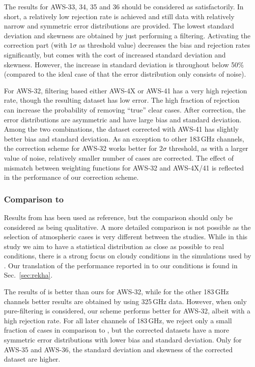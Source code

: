 \documentclass[12pt]{article}
\begin{document}
The results for AWS-33, 34, 35 and 36 should be considered as satisfactorily.
In short, a relatively low rejection rate is achieved and still data with
relatively narrow and symmetric error distributions are provided. The lowest
standard deviation and skewness are obtained by just performing a filtering.
Activating the correction part (with $1\sigma$ as threshold value) decreases
the bias and rejection rates significantly, but comes with the cost of
increased standard deviation and skewness. However, the increase in standard
deviation is throughout below 50\% (compared to the ideal case of that the
error distribution only consists of noise). 

For AWS-32, filtering based either AWS-4X or AWS-41 has a very high rejection
rate, though the resulting dataset has low error. The high fraction of
rejection can increase the probability of removing ``true'' clear cases. After
correction, the error distributions are asymmetric and have large bias and
standard deviation. Among the two combinations, the dataset corrected with
AWS-41 has slightly better bias and standard deviation. As an exception to
other 183\,GHz channels, the correction scheme for AWS-32 works better for
$2\sigma$ threshold, as with a larger value of noise, relatively smaller number
of cases are corrected. The effect of mismatch between weighting functions for
AWS-32 and AWS-4X/41 is reflected in the performance of our correction scheme.

\subsubsection{Comparison to \citet{rekha2012potential}}
%
Results from \citet{rekha2012potential} has been used as reference, but the
comparison should only be considered as being qualitative. A more detailed
comparison is not possible as the selection of atmospheric cases is very
different between the studies. While in this study we aim to have a statistical
distribution as close as possible to real conditions, there is a strong focus on
cloudy conditions in the simulations used by \citet{rekha2012potential}. Our
translation of the performance reported in \citet{rekha2012potential} to our
conditions is found in Sec.~\ref{sec:rekha}.

The results of \citet{rekha2012potential} is better than ours for AWS-32, while
for the other 183\,GHz channels better results are obtained by using 325\,GHz
data. However, when only pure-filtering is considered, our scheme performs
better for AWS-32, albeit with a high rejection rate. For all later channels of
183\,GHz, we reject only a small fraction of cases in comparison to
\citet{rekha2012potential}, but the corrected datasets have a more symmetric error
distributions with lower bias and standard deviation. Only for AWS-35 and AWS-36,
the standard deviation and skewness of the corrected dataset are higher.
\end{document}
